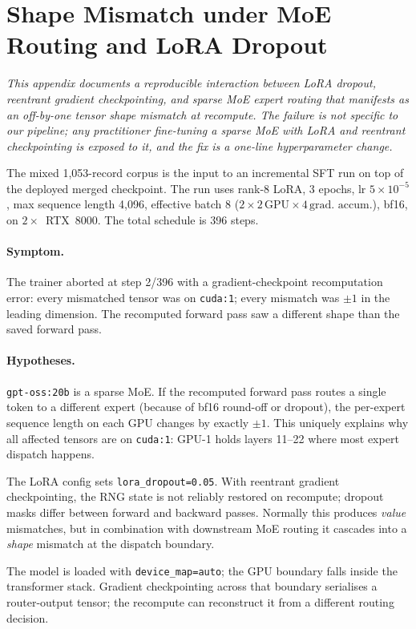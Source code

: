 \documentclass[11pt]{article}
\begin{document}
\section{Shape Mismatch under MoE Routing and LoRA Dropout}
\label{app:moe-failure}

\noindent\textit{This appendix documents a reproducible interaction
between LoRA dropout, reentrant gradient checkpointing, and sparse
MoE expert routing that manifests as an off-by-one tensor shape
mismatch at recompute.  The failure is not specific to our pipeline;
any practitioner fine-tuning a sparse MoE with LoRA and reentrant
checkpointing is exposed to it, and the fix is a one-line
hyperparameter change.}

\medskip
The mixed 1{,}053-record corpus is the input to an incremental SFT run
on top of the deployed merged checkpoint.  The run uses rank-8 LoRA,
3 epochs, lr $5\!\times\!10^{-5}$, max sequence length 4{,}096,
effective batch 8 ($2 \times 2\,\text{GPU} \times 4\,\text{grad.\ accum.}$),
bf16, on $2\times$~RTX~8000.  The total schedule is 396 steps.

\paragraph{Symptom.}  The trainer aborted at step 2/396 with a
gradient-checkpoint recomputation error: every mismatched tensor was on
\texttt{cuda:1}; every mismatch was $\pm 1$ in the leading dimension.
The recomputed forward pass saw a different shape than the saved
forward pass.

\paragraph{Hypotheses.}

\begin{description}[leftmargin=1.4em, itemsep=2pt]
\item[\textbf{H1: MoE expert routing.}]  \texttt{gpt-oss:20b} is a
  sparse MoE.  If the recomputed forward pass routes a single token to
  a different expert (because of bf16 round-off or dropout), the
  per-expert sequence length on each GPU changes by exactly $\pm 1$.
  This uniquely explains why all affected tensors are on
  \texttt{cuda:1}: GPU-1 holds layers 11--22 where most expert
  dispatch happens.
\item[\textbf{H2: LoRA dropout under reentrant checkpointing.}]
  The LoRA config sets \texttt{lora\_dropout=0.05}.  With reentrant
  gradient checkpointing, the RNG state is not reliably restored on
  recompute; dropout masks differ between forward and backward passes.
  Normally this produces \emph{value} mismatches, but in combination
  with downstream MoE routing it cascades into a \emph{shape} mismatch
  at the dispatch boundary.
\item[\textbf{H3: Multi-GPU dispatch.}]  The model is loaded with
  \texttt{device\_map=auto}; the GPU boundary falls inside the
  transformer stack.  Gradient checkpointing across that boundary
  serialises a router-output tensor; the recompute can reconstruct it
  from a different routing decision.
\end{description}
\end{document}
